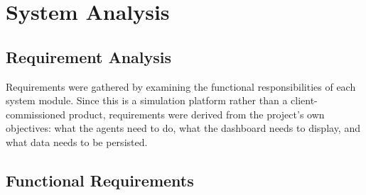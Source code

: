 \chapter{System Analysis}
\label{ch:system_analysis}

\section{Requirement Analysis}
\label{sec:requirement_analysis}

Requirements were gathered by examining the functional responsibilities of each system module. Since this is a simulation platform rather than a client-commissioned product, requirements were derived from the project's own objectives: what the agents need to do, what the dashboard needs to display, and what data needs to be persisted.

\section{Functional Requirements}
\label{sec:functional_requirements}

